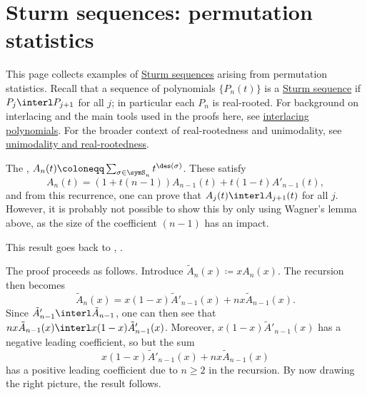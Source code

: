 


\section[interlacingExamples]{Sturm sequences: permutation statistics}

This page collects examples of \hyperref[sturmSequence]{Sturm sequences} arising from permutation statistics.
Recall that a sequence of polynomials $\{P_n(t)\}$ is a \hyperref[sturmSequence]{Sturm sequence} if
$P_j \interl P_{j+1}$ for all $j$;
in particular each $P_n$ is real-rooted.
For background on interlacing and the main tools used in the proofs here,
see \hyperref[interlacingPolynomials]{interlacing polynomials}.
For the broader context of real-rootedness and unimodality,
see \hyperref[polynomialRootIntro]{unimodality and real-rootedness}.

\begin{example*}

The , $A_n(t) \coloneqq \sum_{\sigma \in \symS_n} t^{\des(\sigma)}$.
These satisfy
\[
A_n(t) = (1+t(n-1))A_{n-1}(t) +  t(1-t) A'_{n-1}(t),
\]
and from this recurrence, one can prove that $A_j(t) \interl A_{j+1}(t)$ for all $j$.
However, it is probably not possible to show this by only using Wagner's lemma above,
as the size of the coefficient $(n-1)$ has an impact.

This result goes back to , \cite{Frobenius1910}.

The proof proceeds as follows. Introduce $\tilde{A}_n(x) \coloneqq x A_n(x)$.
The recursion then becomes
\[
\tilde{A}_n(x) = x(1-x)\tilde{A}'_{n-1}(x) + nx \tilde{A}_{n-1}(x).
\]
Since $\tilde{A}'_{n-1} \interl \tilde{A}_{n-1}$, one can then see
that $nx \tilde{A}_{n-1}(x) \interl x(1-x)\tilde{A}'_{n-1}(x)$.
Moreover, $x(1-x)\tilde{A}'_{n-1}(x)$ has a negative leading coefficient, so
but the sum
\[
x(1-x)\tilde{A}'_{n-1}(x) + nx \tilde{A}_{n-1}(x)
\]
has a positive leading coefficient due to $n \geq 2$ in the recursion.
By now drawing the right picture, the result follows.
\end{example*}



